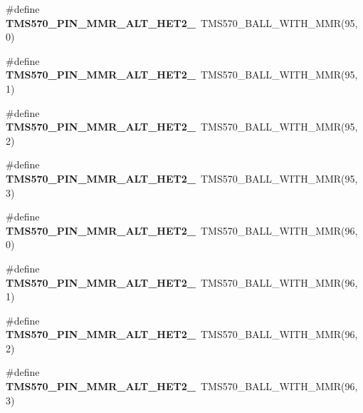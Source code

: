 \begin{DoxyCompactItemize}
\#define {\bfseries T\+M\+S570\+\_\+\+P\+I\+N\+\_\+\+M\+M\+R\+\_\+\+A\+L\+T\+\_\+\+H\+E\+T2\+\_}~T\+M\+S570\+\_\+\+B\+A\+L\+L\+\_\+\+W\+I\+T\+H\+\_\+\+M\+MR(95, 0)
\item 
\mbox{\label{tms570lc4357-pins_8h_a1c1aaf636b93bbdbd41a8176482748fc}} 
\#define {\bfseries T\+M\+S570\+\_\+\+P\+I\+N\+\_\+\+M\+M\+R\+\_\+\+A\+L\+T\+\_\+\+H\+E\+T2\+\_}~T\+M\+S570\+\_\+\+B\+A\+L\+L\+\_\+\+W\+I\+T\+H\+\_\+\+M\+MR(95, 1)
\item 
\mbox{\label{tms570lc4357-pins_8h_ac842a476e816a38cce63bfe9646f4f07}} 
\#define {\bfseries T\+M\+S570\+\_\+\+P\+I\+N\+\_\+\+M\+M\+R\+\_\+\+A\+L\+T\+\_\+\+H\+E\+T2\+\_}~T\+M\+S570\+\_\+\+B\+A\+L\+L\+\_\+\+W\+I\+T\+H\+\_\+\+M\+MR(95, 2)
\item 
\mbox{\label{tms570lc4357-pins_8h_ad7490ac4e28af4ec939974e6c03114f4}} 
\#define {\bfseries T\+M\+S570\+\_\+\+P\+I\+N\+\_\+\+M\+M\+R\+\_\+\+A\+L\+T\+\_\+\+H\+E\+T2\+\_}~T\+M\+S570\+\_\+\+B\+A\+L\+L\+\_\+\+W\+I\+T\+H\+\_\+\+M\+MR(95, 3)
\item 
\mbox{\label{tms570lc4357-pins_8h_a7101b5d80bda7dd0458bc3c62875478c}} 
\#define {\bfseries T\+M\+S570\+\_\+\+P\+I\+N\+\_\+\+M\+M\+R\+\_\+\+A\+L\+T\+\_\+\+H\+E\+T2\+\_}~T\+M\+S570\+\_\+\+B\+A\+L\+L\+\_\+\+W\+I\+T\+H\+\_\+\+M\+MR(96, 0)
\item 
\mbox{\label{tms570lc4357-pins_8h_a573f73870283803e7c068e8adea58bde}} 
\#define {\bfseries T\+M\+S570\+\_\+\+P\+I\+N\+\_\+\+M\+M\+R\+\_\+\+A\+L\+T\+\_\+\+H\+E\+T2\+\_}~T\+M\+S570\+\_\+\+B\+A\+L\+L\+\_\+\+W\+I\+T\+H\+\_\+\+M\+MR(96, 1)
\item 
\mbox{\label{tms570lc4357-pins_8h_a292b44fcce8bdb61aedf8418cb792455}} 
\#define {\bfseries T\+M\+S570\+\_\+\+P\+I\+N\+\_\+\+M\+M\+R\+\_\+\+A\+L\+T\+\_\+\+H\+E\+T2\+\_}~T\+M\+S570\+\_\+\+B\+A\+L\+L\+\_\+\+W\+I\+T\+H\+\_\+\+M\+MR(96, 2)
\item 
\mbox{\label{tms570lc4357-pins_8h_a47754d6aa1508d3616c47cdaa1edefc8}} 
\#define {\bfseries T\+M\+S570\+\_\+\+P\+I\+N\+\_\+\+M\+M\+R\+\_\+\+A\+L\+T\+\_\+\+H\+E\+T2\+\_}~T\+M\+S570\+\_\+\+B\+A\+L\+L\+\_\+\+W\+I\+T\+H\+\_\+\+M\+MR(96, 3)

\end{DoxyCompactItemize}
